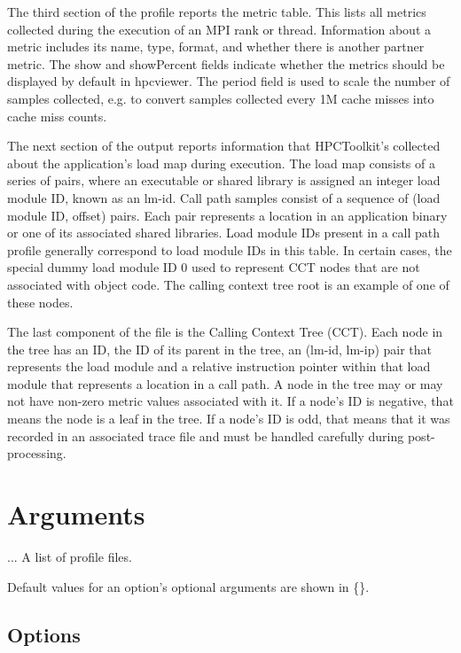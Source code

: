 \documentclass[english]{article}
\begin{document}
The third section of the profile reports the metric table.  This lists
all metrics collected during the execution of an MPI rank or thread.
Information about a metric includes its name, type, format, and whether
there is another partner metric.  The show and showPercent fields
indicate whether the metrics should be displayed by default in hpcviewer.
The period field is used to scale the number of samples collected, e.g. to
convert samples collected every 1M cache misses into cache miss counts.

The next section of the output reports information that HPCToolkit's
collected about the application's load map during execution.  The load
map consists of a series of pairs, where an executable or shared
library is assigned an integer load module ID, known as an lm-id.
Call path samples consist of a sequence of (load module ID, offset)
pairs. Each pair represents a location in an application binary or one
of its associated shared libraries. Load module IDs present in a call
path profile generally correspond to load module IDs in this table. In
certain cases, the special dummy load module ID 0 used to represent CCT
nodes that are not associated with object code. The calling context tree
root is an example of one of these nodes.

The last component of the file is the Calling Context Tree (CCT). Each
node in the tree has an ID, the ID of its parent in the tree, an
(lm-id, lm-ip) pair that represents the load module and a relative
instruction pointer within that load module that represents a location
in a call path.  A node in the tree may or may not have non-zero metric
values associated with it. If a node's ID is negative, that means the
node is a leaf in the tree. If a node's ID is odd, that means that it
was recorded in an associated trace file and must be handled carefully
during post-processing.

\section{Arguments}

\begin{Description}
\item[\Arg{profile-file}...] A list of profile files.
\end{Description}

Default values for an option's optional arguments are shown in \{\}.

\subsection{Options}
\end{document}
